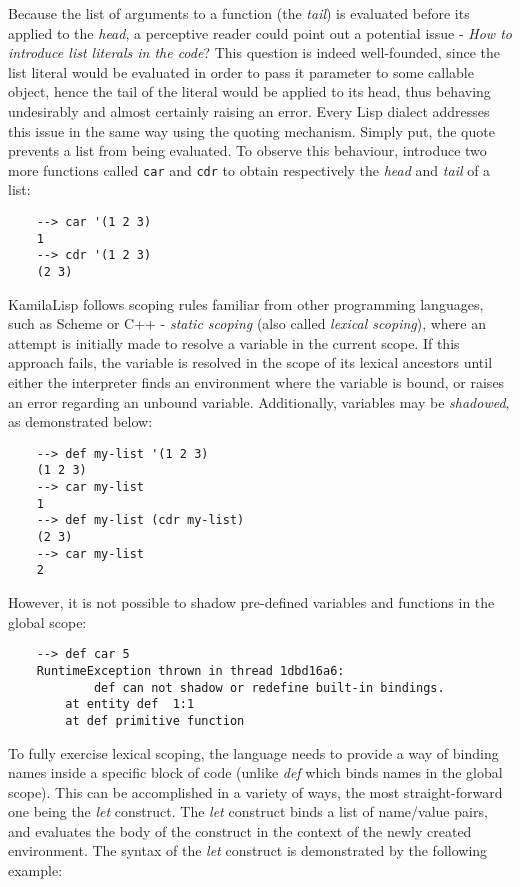 Because the list of arguments to a function (the \textit{tail}) is evaluated before its applied to the \textit{head}, a perceptive reader could point out a potential issue - \textit{How to introduce list literals in the code}? This question is indeed well-founded, since the list literal would be evaluated in order to pass it parameter to some callable object, hence the tail of the literal would be applied to its head, thus behaving undesirably and almost certainly raising an error. Every Lisp dialect addresses this issue in the same way using the quoting mechanism. Simply put, the quote prevents a list from being evaluated. To observe this behaviour, introduce two more functions called \verb|car| and \verb|cdr| to obtain respectively the \textit{head} and \textit{tail} of a list:

\begin{Verbatim}
    --> car '(1 2 3)
    1
    --> cdr '(1 2 3)
    (2 3)
\end{Verbatim}

KamilaLisp follows scoping rules familiar from other programming languages, such as Scheme or C++ - \textit{static scoping} (also called \textit{lexical scoping}), where an attempt is initially made to resolve a variable in the current scope. If this approach fails, the variable is resolved in the scope of its lexical ancestors until either the interpreter finds an environment where the variable is bound, or raises an error regarding an unbound variable. Additionally, variables may be \textit{shadowed}, as demonstrated below:

\begin{Verbatim}
    --> def my-list '(1 2 3)
    (1 2 3)
    --> car my-list
    1
    --> def my-list (cdr my-list)
    (2 3)
    --> car my-list
    2
\end{Verbatim}

However, it is not possible to shadow pre-defined variables and functions in the global scope:

\begin{Verbatim}
    --> def car 5
    RuntimeException thrown in thread 1dbd16a6:
            def can not shadow or redefine built-in bindings.
        at entity def  1:1
        at def primitive function
\end{Verbatim}

To fully exercise lexical scoping, the language needs to provide a way of binding names inside a specific block of code (unlike \textit{def} which binds names in the global scope). This can be accomplished in a variety of ways, the most straight-forward one being the \textit{let} construct. The \textit{let} construct binds a list of name/value pairs, and evaluates the body of the construct in the context of the newly created environment. The syntax of the \textit{let} construct is demonstrated by the following example:

